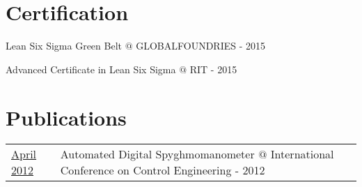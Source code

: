 \documentclass[]{bigfatnoob-resume}
\begin{document}
\begin{minipage}[t]{0.66\textwidth}
		\section{Certification}
		\vspace{\topsep}
		\begin{tightemize}
			\item Lean Six Sigma {\ibf Green Belt} $@$ GLOBALFOUNDRIES - 2015
			\item {\ibf Advanced Certificate} in Lean Six Sigma $@$ RIT - 2015
		\end{tightemize}
		
		
		\section{Publications} 
		\begin{tabular}{p{2cm}p{9.2cm}}
			\href{http://sandeepmohan.com/files/Digital_Sphygmomanometer.pdf}{April 2012} & {\ibf Automated Digital Spyghmomanometer} $@$ International Conference on Control Engineering - 2012\\
		\end{tabular}
		\sectionsep
		
	\end{minipage} 
\end{document}
